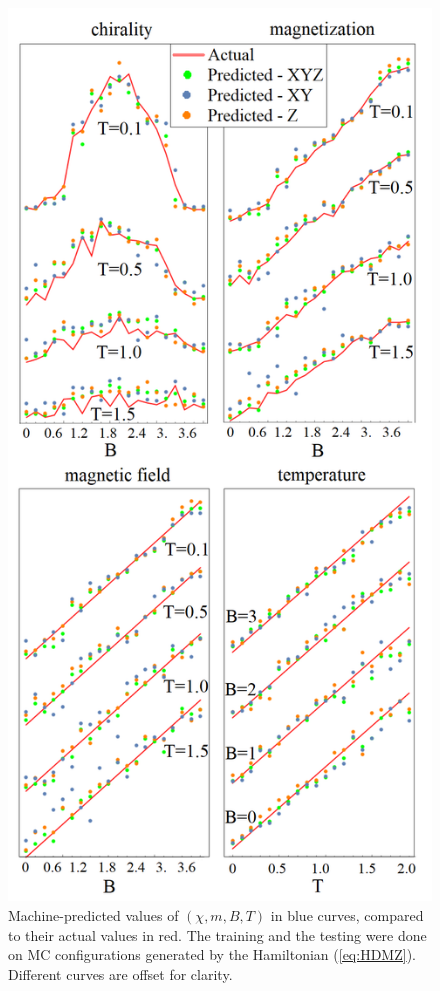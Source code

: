 \documentclass[reprint,amsmath,amssymb,aps,showpacs,superscriptaddress,prl]{revtex4-1}
\begin{document}
\begin{figure}[h]
\includegraphics[scale=0.6]{fig3.png}
\caption{Machine-predicted values of $(\chi, m, B, T)$ in blue curves, compared to their actual values in red. The training and the testing were done on MC configurations generated by the Hamiltonian (\ref{eq:HDMZ}). Different curves are offset for clarity.}\label{fig:2}
\end{figure}
\end{document}
